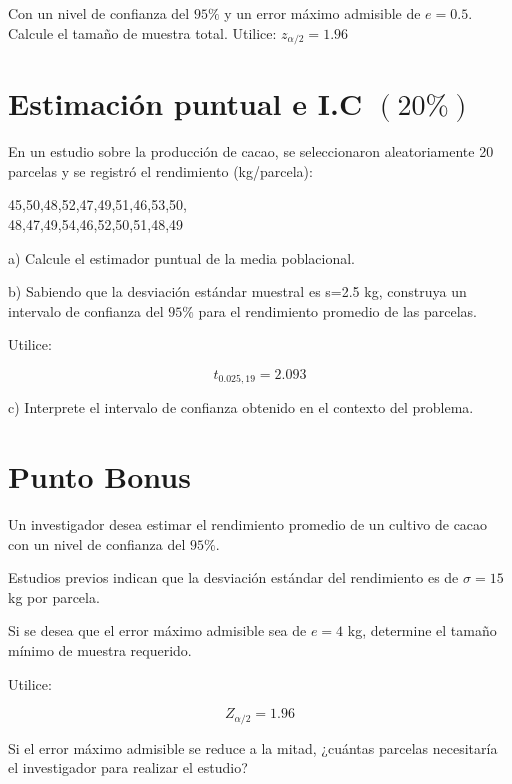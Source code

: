 \documentclass[12pt]{article}
\begin{document}
Con un nivel de confianza del $95\%$ y un error máximo admisible de $e=0.5$. Calcule el tamaño de muestra total.
Utilice: $z_{\alpha/2}=1.96$



\section{Estimación puntual e I.C $(20\%)$}
En un estudio sobre la producción de cacao, se seleccionaron aleatoriamente 20 parcelas y se registró el rendimiento (kg/parcela):

\begin{center}
45,50,48,52,47,49,51,46,53,50,\\
48,47,49,54,46,52,50,51,48,49
\end{center}

a) Calcule el estimador puntual de la media poblacional.

b) Sabiendo que la desviación estándar muestral es s=2.5 kg, construya un intervalo de confianza del $95\%$ para el rendimiento promedio de las parcelas.

Utilice:

$$t_{0.025,19}=2.093$$

c) Interprete el intervalo de confianza obtenido en el contexto del problema.

\section{Punto Bonus}
Un investigador desea estimar el rendimiento promedio de un cultivo de cacao con un nivel de confianza del $95\%.$

Estudios previos indican que la desviación estándar del rendimiento es de $\sigma=15$ kg por parcela.

Si se desea que el error máximo admisible sea de $e=4$ kg, determine el tamaño mínimo de muestra requerido.

Utilice:


$$Z_{\alpha/2}=1.96$$

Si el error máximo admisible se reduce a la mitad, ¿cuántas parcelas necesitaría el investigador para realizar el estudio?
\end{document}
